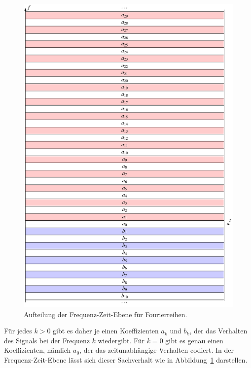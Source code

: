 \begin{figure}
\centering
\includegraphics{chapters/2-fourier/images/ft.pdf}
\vspace{-3mm}
\caption{Aufteilung der Frequenz-Zeit-Ebene für Fourierreihen.
\label{ft:ftplane}}
\end{figure}

Für jedes $k>0$ gibt es daher je einen Koeffizienten $a_k$ und $b_k$,
der das Verhalten des Signals bei der Frequenz $k$ wiedergibt.
Für $k=0$ gibt es genau einen Koeffizienten, nämlich $a_0$, der das
zeitunabhängige Verhalten codiert.
In der Frequenz-Zeit-Ebene lässt sich dieser Sachverhalt wie in 
Abbildung~\ref{ft:ftplane} darstellen.

